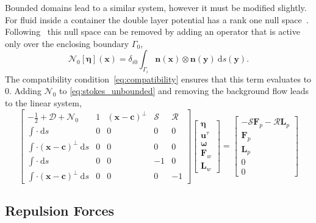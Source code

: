 \documentclass[preprint, 10pt]{elsarticle}
\begin{document}
Bounded domains lead to a similar system, however it must be modified slightly. For fluid inside a container the double layer potential has a rank one null space~\cite{Ladyzhenskaya1963}. Following~\cite{Power1993} this null space can be removed by adding an operator that is active only over the enclosing boundary $\Gamma_0$,
\[ \mathcal{N}_0[\pmb{\eta}](\mathbf{x}) = \delta_{i0} \int_{\Gamma_i}\mathbf{n}(\mathbf{x})\otimes\mathbf{n}(\mathbf{y})~\text{d}s(\mathbf{y}).\]
The compatibility condition~\eqref{eq:compatibility} ensures that this term evaluates to 0. Adding $\mathcal{N}_0$ to \eqref{eq:stokes_unbounded} and removing the background flow leads to the linear system,
\begin{equation}\label{eq:stokes_bounded} \begin{bmatrix} -\frac{1}{2} + \mathcal{D} + \mathcal{N}_0 & 1 & (\mathbf{x}-\mathbf{c})^\perp & \mathcal{S} & \mathcal{R}\\
		\int \cdot~ \text{d}s & 0 & 0 & 0 & 0\\
		\int\cdot(\mathbf{x}-\mathbf{c})^\perp~\text{d}s & 0 & 0 & 0 & 0\\
		\int \cdot~ \text{d}s & 0 & 0 & - 1 & 0\\
		\int\cdot(\mathbf{x}-\mathbf{c})^\perp~\text{d}s & 0 & 0 & 0 & -1\end{bmatrix}
\begin{bmatrix}
	\pmb{\eta}\\\mathbf{u}^\tau \\ \pmb{\omega} \\ \mathbf{F}_w \\\mathbf{ L}_w
\end{bmatrix}
=
\begin{bmatrix}
	 - \mathcal{S}\mathbf{F}_p - \mathcal{R}\mathbf{L}_p\\
	\mathbf{F}_p\\
	\mathbf{L}_p\\
	0\\
	0
\end{bmatrix}
\end{equation}



\subsection{Repulsion Forces}
\end{document}
